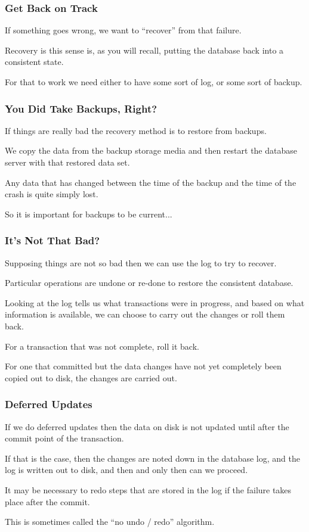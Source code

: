 \begin{frame}
\frametitle{Get Back on Track}

If something goes wrong, we want to ``recover'' from that failure. 

Recovery is this sense is, as you will recall, putting the database back into a consistent state. 

For that to work we need either to have some sort of log, or some sort of backup.

\end{frame}


\begin{frame}
\frametitle{You Did Take Backups, Right?}

If things are really bad the recovery method is to restore from backups. 

We copy the data from the backup storage media and then restart the database server with that restored data set. 

Any data that has changed between the time of the backup and the time of the crash is quite simply lost. 

So it is important for backups to be current...


\end{frame}



\begin{frame}
\frametitle{It's Not That Bad?}

Supposing things are not so bad then we can use the log to try to recover. 

Particular operations are undone or re-done to restore the consistent database. 

Looking at the log tells us what transactions were in progress, and based on what information is available, we can choose to carry out the changes or roll them back. 

For a transaction that was not complete, roll it back.

 For one that committed but the data changes have not yet completely been copied out to disk, the changes are carried out.


\end{frame}


\begin{frame}
\frametitle{Deferred Updates}

If we do \alert{deferred updates} then the data on disk is not updated until after the commit point of the transaction. 

If that is the case, then the changes are noted down in the database log, and the log is written out to disk, and then and only then can we proceed.

It may be necessary to redo steps that are stored in the log if the failure takes place after the commit. 

This is sometimes called the ``no undo / redo'' algorithm.

\end{frame}

